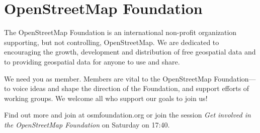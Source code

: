 \newpage
\section*{OpenStreetMap Foundation}
\label{osmf}
\pagestyle{osmf}
The OpenStreetMap Foundation is an
international non-profit organization
supporting, but not controlling,
OpenStreetMap. We are dedicated to
encouraging the growth, development and
distribution of free geospatial data and to
providing geospatial data for anyone to use
and share.

We need you as member. Members are vital
to the OpenStreetMap Foundation---to voice ideas
and shape the direction of the Foundation,
and support efforts of working groups. We
welcome all who support our goals to join us!

Find out more and join at osmfoundation.org
or join the session \emph{Get involved in the OpenStreetMap Foundation} on Saturday on 17:40.
